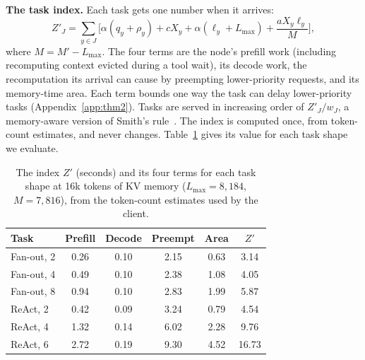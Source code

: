\documentclass{article}
\begin{document}
\textbf{The task index.} Each task gets one number when it arrives:
\begin{equation}
Z'_J = \sum_{y \in J} \Big[\alpha(q_y+\rho_y) + cX_y + \alpha(\ell_y + L_{\max}) + \frac{a X_y \ell_y}{M}\Big],
\label{eq:z}
\end{equation}
where $M = M' - L_{\max}$. The four terms are the node's prefill work (including recomputing context evicted
during a tool wait), its decode work, the recomputation its arrival can cause by preempting lower-priority
requests, and its memory-time area. Each term bounds one way the task can delay lower-priority tasks
(Appendix~\ref{app:thm2}). Tasks are served in increasing order of $Z'_J/w_J$, a memory-aware version of Smith's
rule~\cite{smith1956various}. The index is computed once, from token-count estimates, and never changes.
Table~\ref{tab:z} gives its value for each task shape we evaluate.

\begin{table}[t]
\caption{The index $Z'$ (seconds) and its four terms for each task shape at 16k tokens of KV memory
($L_{\max} = 8{,}184$, $M = 7{,}816$), from the token-count estimates used by the client.}
\label{tab:z}
\centering
\small
\begin{tabular}{lccccc}
\toprule
Task & Prefill & Decode & Preempt & Area & $Z'$ \\
\midrule
Fan-out, 2 & 0.26 & 0.10 & 2.15 & 0.63 & 3.14 \\
Fan-out, 4 & 0.49 & 0.10 & 2.38 & 1.08 & 4.05 \\
Fan-out, 8 & 0.94 & 0.10 & 2.83 & 1.99 & 5.87 \\
ReAct, 2   & 0.42 & 0.09 & 3.24 & 0.79 & 4.54 \\
ReAct, 4   & 1.32 & 0.14 & 6.02 & 2.28 & 9.76 \\
ReAct, 6   & 2.72 & 0.19 & 9.30 & 4.52 & 16.73 \\
\bottomrule
\end{tabular}
\end{table}
\end{document}
